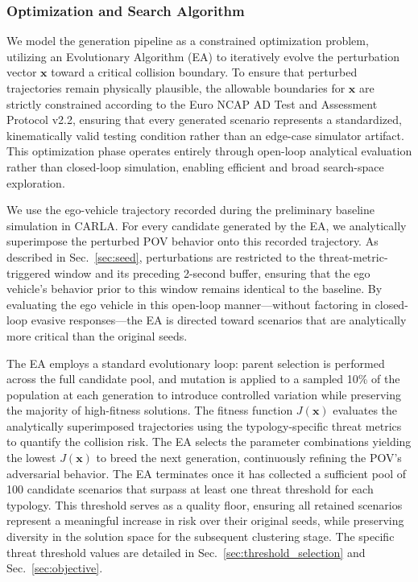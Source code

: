 \subsubsection{Optimization and Search Algorithm}\label{sec:optimization}
We model the generation pipeline as a constrained optimization problem, utilizing an Evolutionary Algorithm (EA) to iteratively evolve the perturbation vector $\mathbf{x}$ toward a critical collision boundary. To ensure that perturbed trajectories remain physically plausible, the allowable boundaries for $\mathbf{x}$ are strictly constrained according to the Euro NCAP AD Test and Assessment Protocol v2.2, ensuring that every generated scenario represents a standardized, kinematically valid testing condition rather than an edge-case simulator artifact. This optimization phase operates entirely through open-loop analytical evaluation rather than closed-loop simulation, enabling efficient and broad search-space exploration.

We use the ego-vehicle trajectory recorded during the preliminary baseline simulation in CARLA. For every candidate generated by the EA, we analytically superimpose the perturbed POV behavior onto this recorded trajectory. As described in Sec.~\ref{sec:seed}, perturbations are restricted to the threat-metric-triggered window and its preceding 2-second buffer, ensuring that the ego vehicle's behavior prior to this window remains identical to the baseline. By evaluating the ego vehicle in this open-loop manner---without factoring in closed-loop evasive responses---the EA is directed toward scenarios that are analytically more critical than the original seeds.

The EA employs a standard evolutionary loop: parent selection is performed across the full candidate pool, and mutation is applied to a sampled 10\% of the population at each generation to introduce controlled variation while preserving the majority of high-fitness solutions. The fitness function $J(\mathbf{x})$ evaluates the analytically superimposed trajectories using the typology-specific threat metrics to quantify the collision risk. The EA selects the parameter combinations yielding the lowest $J(\mathbf{x})$ to breed the next generation, continuously refining the POV's adversarial behavior. The EA terminates once it has collected a sufficient pool of 100 candidate scenarios that surpass at least one threat threshold for each typology. This threshold serves as a quality floor, ensuring all retained scenarios represent a meaningful increase in risk over their original seeds, while preserving diversity in the solution space for the subsequent clustering stage. The specific threat threshold values are detailed in Sec.~\ref{sec:threshold_selection} and Sec.~\ref{sec:objective}.

